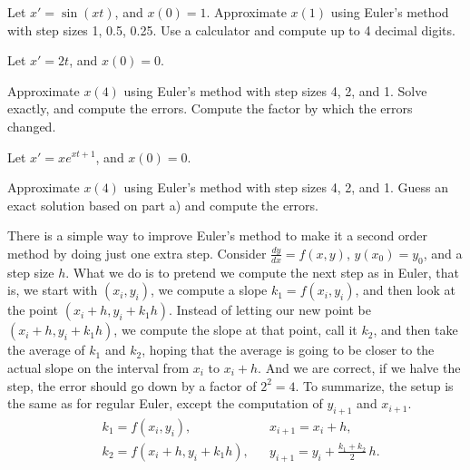 \begin{exercise}
Let $x' = \sin(xt)$, and $x(0)=1$.
Approximate $x(1)$ using Euler's method with step sizes 1, 0.5, 0.25.
Use a calculator and compute up to 4 decimal digits.
\end{exercise}

\begin{exercise}
Let $x' = 2t$, and $x(0)=0$.
\begin{tasks}
\task Approximate $x(4)$ using Euler's method with step sizes 4, 2, and 1.
\task Solve exactly, and compute the errors.
\task Compute the factor by which the errors changed.
\end{tasks}
\end{exercise}

\begin{samepage}
\begin{exercise}
Let $x' = x e^{xt+1}$, and $x(0)=0$.
\begin{tasks}
\task Approximate $x(4)$ using Euler's method with step sizes 4, 2, and 1.
\task Guess an exact solution based on part a) and compute the errors.
\end{tasks}
\end{exercise}
\end{samepage}

There is a simple way to improve Euler's method to make it a
second order method by doing just one extra step.
Consider $\frac{dy}{dx}=f(x,y)$, $y(x_0) = y_0$,
and a step size $h$.
What we do is to pretend we compute the next step as in Euler,
that is, we start with $(x_i,y_i)$, we compute a
slope $k_1 = f(x_i,y_i)$, and then look at the point $(x_i+h,y_i + k_1h)$.
Instead of letting our new point be $(x_i+h,y_i + k_1h)$, we compute
the slope at that point, call it $k_2$, and then take the average
of $k_1$ and $k_2$, hoping that the average is going to be closer to
the actual slope on the interval from $x_i$ to $x_i+h$.  And we are correct,
if we halve the step, the error should go down by a factor of $2^2 = 4$.
To summarize, the setup is the
same as for regular Euler, except
the computation of $y_{i+1}$ and $x_{i+1}$.
\begin{align*}
& k_1 = f(x_i,y_i) , & & 
x_{i+1} = x_i + h , \\
& k_2 = f(x_i + h,y_i + k_1h) ,
& & y_{i+1} = y_i + \frac{k_1+k_2}{2}\,h .
\end{align*}


